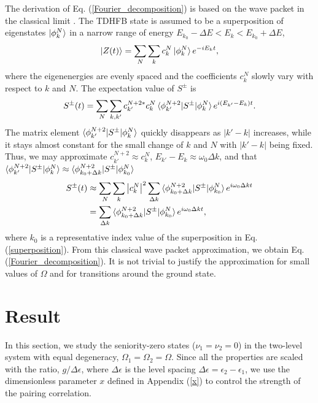 \documentclass[11pt]{book} %
\begin{document}
The derivation  of Eq. (\ref{Fourier_decomposition})
is based on the wave packet in the
classical limit \cite{LL65}.
The TDHFB state is assumed to be a superposition of eigenstates $\ket{\phi_k^N}$
in a narrow range of energy $E_{k_0}-\Delta E<E_k<E_{k_0}+\Delta E$,
\begin{equation}
	\ket{Z(t)} = \sum_N \sum_k c_k^N \ket{\phi_k^N} e^{-iE_k t} ,
	\label{superposition}
\end{equation}
where the eigenenergies are evenly spaced and
the coefficients $c_k^N$ slowly vary with respect to $k$ and $N$.
The expectation value of $S^\pm$ is
\begin{equation}
	S^\pm(t) = \sum_{N} \sum_{k,k'} c_{k'}^{N+2*} c_k^N 
	\braket{\phi_{k'}^{N+2}|S^\pm|\phi_k^N} e^{i(E_{k'}-E_k)t} .
\end{equation}
The matrix element $\braket{\phi_{k'}^{N+2}|S^\pm|\phi_k^N}$
quickly disappears as $|k'-k|$ increases, while it stays almost constant
for the small change of $k$ and $N$ with $|k'-k|$ being fixed.
Thus, we may approximate $c_{k'}^{N+2}\approx c_k^N$,
$E_{k'}-E_k\approx \omega_0 \Delta k$, and
that $\braket{\phi_{k'}^{N+2}|S^\pm|\phi_k^N}\approx
\braket{\phi_{k_0+\Delta k}^{N+2}|S^\pm|\phi_{k_0}^N}$ 
\begin{align}
	S^\pm(t) &\approx \sum_{N} \sum_{k} \left|c_k^N\right|^2
	\sum_{\Delta k}
	\braket{\phi_{k_0+\Delta k}^{N+2}|S^\pm|\phi_{k_0}^N}
	e^{i\omega_0 \Delta k t}  \nonumber \\
	&= \sum_{\Delta k}
	\braket{\phi_{k_0+\Delta k}^{N+2}|S^\pm|\phi_{k_0}^N}
	e^{i\omega_0 \Delta k t}  ,
\end{align}
where $k_0$ is a representative index value of the superposition in 
Eq. (\ref{superposition}).
From this classical wave packet approximation,
we obtain Eq. (\ref{Fourier_decomposition}).
It is not trivial to justify the approximation for small values of $\Omega$
and for transitions around the ground state.

\section{Result}
\label{3-3}
In this section, we study the seniority-zero states ($\nu_1=\nu_2=0$) in
the two-level system with equal degeneracy, $\Omega_1=\Omega_2=\Omega$.
Since all the properties are scaled with the ratio, $g/\Delta\epsilon$,
where $\Delta\epsilon$ is the level spacing
$\Delta\epsilon=\epsilon_2-\epsilon_1$,
we use the dimensionless parameter $x$ defined in Appendix (\ref{x}) to control the strength of the pairing correlation.
\end{document}
